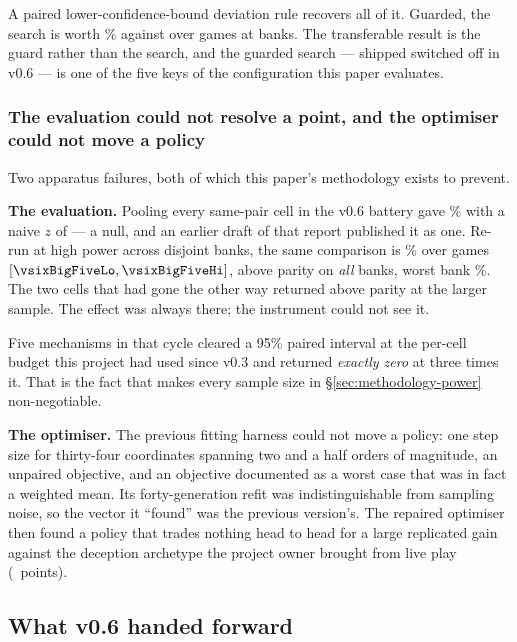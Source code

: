 A paired lower-confidence-bound deviation rule recovers all of it. Guarded, the search is worth \vsixSearchPooled\% against \vfive{} over \vsixSearchPooledN{} games at
\vsixSearchPooledBanks{} banks. The transferable result is the guard rather than the search, and the
guarded search --- shipped switched off in v0.6 --- is one of the five keys of the configuration
this paper evaluates.

\subsubsection{The evaluation could not resolve a point, and the optimiser could not move a policy}
\label{sec:arc-vsix-apparatus}

Two apparatus failures, both of which this paper's methodology exists to prevent.

\textbf{The evaluation.} Pooling every same-pair cell in the v0.6 battery gave \vsixHeadPooled\%
with a naive $z$ of \vsixHeadZ{} --- a null, and an earlier draft of that report published it as
one. Re-run at high power across \vsixBigFiveBanks{} disjoint banks, the same comparison is
\vsixBigFive\% over \vsixBigFiveN{} games $[\vsixBigFiveLo, \vsixBigFiveHi]$, above parity on
\emph{all \vsixBigFiveAbove{}} banks, worst bank \vsixBigFiveMin\%. The two cells that had gone the
other way returned above parity at the larger sample. The effect was always there; the instrument
could not see it.

Five mechanisms in that cycle cleared a 95\% paired interval at the per-cell budget this project had
used since v0.3 and returned \emph{exactly zero} at three times it. That is the fact that makes
every sample size in \S\ref{sec:methodology-power} non-negotiable.

\textbf{The optimiser.} The previous fitting harness could not move a policy: one step size for
thirty-four coordinates spanning two and a half orders of magnitude, an unpaired objective, and an
objective documented as a worst case that was in fact a weighted mean. Its forty-generation refit
was indistinguishable from sampling noise, so the vector it ``found'' was the previous version's.
The repaired optimiser then found a policy that trades nothing head to head for a large replicated
gain against the deception archetype the project owner brought from live play
(\vsixPoolWithholderGain{}~points).

\subsection{What v0.6 handed forward}
\label{sec:arc-handoff}

